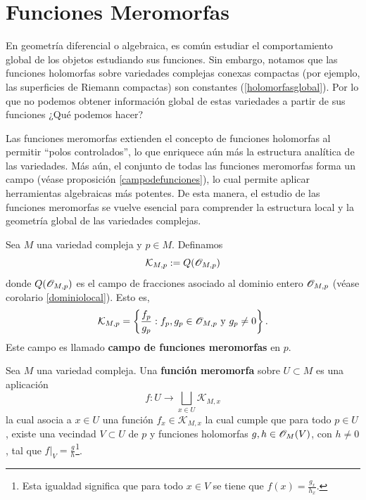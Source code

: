 \section{Funciones Meromorfas}

En geometría diferencial o algebraica, es común estudiar el comportamiento global de los objetos estudiando sus funciones. Sin embargo, notamos que las funciones holomorfas sobre variedades complejas conexas compactas (por ejemplo, las superficies de Riemann compactas) son constantes (\ref{holomorfasglobal}). Por lo que no podemos obtener información global de estas variedades a partir de sus funciones ¿Qué podemos hacer?

Las funciones meromorfas extienden el concepto de funciones holomorfas al permitir \enquote{polos controlados}, lo que enriquece aún más la estructura analítica de las variedades. Más aún, el conjunto de todas las funciones meromorfas forma un campo (véase proposición \ref{campodefunciones}), lo cual permite aplicar herramientas algebraicas más potentes. De esta manera, el estudio de las funciones meromorfas se vuelve esencial para comprender la estructura local y la geometría global de las variedades complejas.

\begin{definition}
	Sea $M$ una variedad compleja y $p\in M$. Definamos
	\begin{equation*}
		\mathcal{K}_{M,p}:=Q(\mathscr{O}_{M,p})
	\end{equation*}
	donde $Q(\mathscr{O}_{M,p})$ es el campo de fracciones asociado al dominio entero $\mathscr{O}_{M,p}$ (véase corolario \ref{dominiolocal}). Esto es,
	\begin{equation*}
		\mathcal{K}_{M,p}=\left\{ \frac{f_p}{g_p}:f_p,g_p\in\mathscr{O}_{M,p}\text{ y }g_p\neq 0\right\}.
	\end{equation*}
	Este campo es llamado \textbf{campo de funciones meromorfas} en $p$.
\end{definition}  

\begin{definition}
	Sea $M$ una variedad compleja. Una \textbf{función meromorfa} sobre $U\subset M$ es una aplicación
	\begin{equation*}
		f:U\longrightarrow \bigsqcup_{x\in U}\mathcal{K}_{M,x}
	\end{equation*}
	la cual asocia a $x\in U$ una función $f_x\in \mathcal{K}_{M,x}$ la cual cumple que para todo $p\in U$, existe una vecindad $V\subset U$ de $p$ y funciones holomorfas $g,h\in\mathscr{O}_M(V)$, con $h\neq 0$, tal que $f|_V=\frac{g}{h}$\footnote{Esta igualdad significa que para todo $x\in V$ se tiene que $f(x)=\frac{g_x}{h_x}$.}.
\end{definition}

